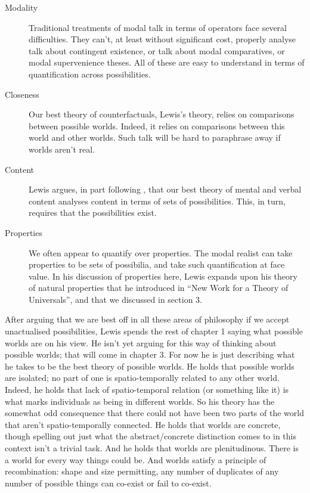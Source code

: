 \begin{description}

\item [Modality] Traditional treatments of modal talk in terms of operators face several difficulties. They can't, at least without significant cost, properly analyse talk about contingent existence, or talk about modal comparatives, or modal supervenience theses. All of these are easy to understand in terms of quantification across possibilities.

\item [Closeness] Our best theory of counterfactuals, Lewis's theory, relies on comparisons between possible worlds. Indeed, it relies on comparisons between this world and other worlds. Such talk will be hard to paraphrase away if worlds aren't real.

\item [Content] Lewis argues, in part following \citet{Stalnaker1984}, that our best theory of mental and verbal content analyses content in terms of sets of possibilities. This, in turn, requires that the possibilities exist.

\item [Properties] We often appear to quantify over properties. The modal realist can take properties to be sets of possibilia, and take such quantification at face value. In his discussion of properties here, Lewis expands upon his theory of natural properties that he introduced in ``New Work for a Theory of Universals'', and that we discussed in section 3.

\end{description}

\noindent After arguing that we are best off in all these areas of philosophy if we accept unactualised possibilities, Lewis spends the rest of chapter 1 saying what possible worlds are on his view. He isn't yet arguing for this way of thinking about possible worlds; that will come in chapter 3. For now he is just describing what he takes to be the best theory of possible worlds. He holds that possible worlds are isolated; no part of one is spatio-temporally related to any other world. Indeed, he holds that lack of spatio-temporal relation (or something like it) is what marks individuals as being in different worlds. So his theory has the somewhat odd consequence that there could not have been two parts of the world that aren't spatio-temporally connected. He holds that worlds are concrete, though spelling out just what the abstract/concrete distinction comes to in this context isn't a trivial task. And he holds that worlds are plenitudinous. There is a world for every way things could be. And worlds satisfy a principle of recombination: shape and size permitting, any number of duplicates of any number of possible things can co-exist or fail to co-exist.

